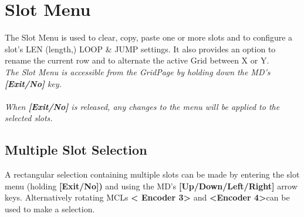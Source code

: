 \chapter{Slot Menu}
The Slot Menu is used to clear, copy, paste one or more slots and to configure a slot's LEN (length,) LOOP \& JUMP settings. It also provides an option to rename the current row and to alternate the active Grid between X or Y.
\\
\textit{The Slot Menu is accessible from the GridPage by holding down the MD's \textbf{[Exit/No]} key.\\\\When \textbf{[Exit/No]} is released, any changes to the menu will be applied to the selected slots. }
\section{Multiple Slot Selection}
A rectangular selection containing multiple slots can be made by entering the slot menu (holding \textbf{[Exit/No])} and using the MD's \textbf{[Up/Down/Left/Right]} arrow keys. 
Alternatively rotating MCLs \textbf{< Encoder 3>} and \textbf{<Encoder 4>}can be used to make a selection.
